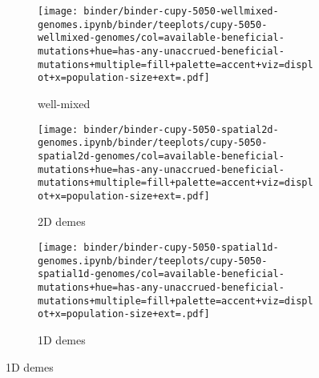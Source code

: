 \begin{figure}[h]

\begin{subfigure}[b]{\linewidth}
    \begin{minipage}{\textwidth}
      \texttt{[image: binder/binder-cupy-5050-wellmixed-genomes.ipynb/binder/teeplots/cupy-5050-wellmixed-genomes/col=available-beneficial-mutations+hue=has-any-unaccrued-beneficial-mutations+multiple=fill+palette=accent+viz=displot+x=population-size+ext=.pdf]}%
    \end{minipage}
    \begin{minipage}{\textwidth}
    \caption{well-mixed}
    \label{fig:unaccrued-5050-cupy:wellmixed}
    \end{minipage}%
\end{subfigure}%

\begin{subfigure}[b]{\linewidth}
    \begin{minipage}{\textwidth}
      \texttt{[image: binder/binder-cupy-5050-spatial2d-genomes.ipynb/binder/teeplots/cupy-5050-spatial2d-genomes/col=available-beneficial-mutations+hue=has-any-unaccrued-beneficial-mutations+multiple=fill+palette=accent+viz=displot+x=population-size+ext=.pdf]}%
    \end{minipage}
    \begin{minipage}{\textwidth}
    \caption{2D demes}
    \label{fig:unaccrued-5050-cupy:spatial2d}
    \end{minipage}%
\end{subfigure}%

\begin{subfigure}[b]{\linewidth}
    \begin{minipage}{\textwidth}
      \texttt{[image: binder/binder-cupy-5050-spatial1d-genomes.ipynb/binder/teeplots/cupy-5050-spatial1d-genomes/col=available-beneficial-mutations+hue=has-any-unaccrued-beneficial-mutations+multiple=fill+palette=accent+viz=displot+x=population-size+ext=.pdf]}%
    \end{minipage}
    \begin{minipage}{\textwidth}
    \caption{1D demes}
    \label{fig:unaccrued-5050-cupy:spatial1d}
    \end{minipage}%
\end{subfigure}


\end{figure}
